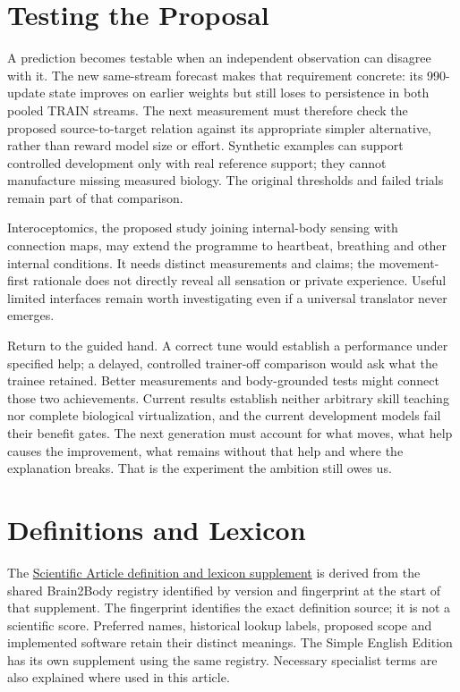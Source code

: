\section{Testing the Proposal}

A prediction becomes testable when an independent observation can disagree with it. The new same-stream forecast makes that requirement concrete: its 990-update state improves on earlier weights but still loses to persistence in both pooled TRAIN streams. The next measurement must therefore check the proposed source-to-target relation against its appropriate simpler alternative, rather than reward model size or effort. Synthetic examples can support controlled development only with real reference support; they cannot manufacture missing measured biology. The original thresholds and failed trials remain part of that comparison.\par

Interoceptomics, the proposed study joining internal-body sensing with connection maps, may extend the programme to heartbeat, breathing and other internal conditions. It needs distinct measurements and claims; the movement-first rationale does not directly reveal all sensation or private experience. Useful limited interfaces remain worth investigating even if a universal translator never emerges.\par

Return to the guided hand. A correct tune would establish a performance under
specified help; a delayed, controlled trainer-off comparison would ask what the
trainee retained. Better measurements and body-grounded tests might connect
those two achievements. Current results establish neither arbitrary skill
teaching nor complete biological virtualization, and the current development
models fail their benefit gates. The next generation must account for what
moves, what help causes the improvement, what remains without that help and
where the explanation breaks. That is the experiment the ambition still owes
us.\par

\section{Definitions and Lexicon}

The \hyperref[programme-definitions]{Scientific Article definition and lexicon supplement} is derived from the shared Brain2Body registry identified by version and fingerprint at the start of that supplement. The fingerprint identifies the exact definition source; it is not a scientific score. Preferred names, historical lookup labels, proposed scope and implemented software retain their distinct meanings. The Simple English Edition has its own supplement using the same registry. Necessary specialist terms are also explained where used in this article.\par

